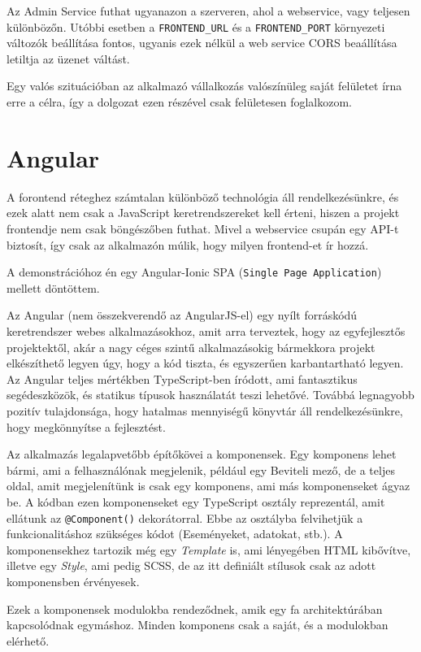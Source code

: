 \documentclass[a4paper,12pt]{thesis-ekf}
\theoremstyle{definition}
\begin{document}
		Az Admin Service futhat ugyanazon a szerveren, ahol a webservice, vagy teljesen különbözőn. Utóbbi esetben a \verb|FRONTEND_URL| és a \verb|FRONTEND_PORT| környezeti változók beállítása fontos, ugyanis ezek nélkül a web service CORS beaállítása letiltja az üzenet váltást.
		
		Egy valós szituációban az alkalmazó vállalkozás valószínüleg saját felületet írna erre a célra, így a dolgozat ezen részével csak felületesen foglalkozom.
		
		\section{Angular}
    		A forontend réteghez számtalan különböző technológia áll rendelkezésünkre, és ezek alatt nem csak a JavaScript keretrendszereket kell érteni, hiszen a projekt frontendje nem csak böngészőben futhat. Mivel a webservice csupán egy API-t biztosít, így csak az alkalmazón múlik, hogy milyen frontend-et ír hozzá.
    		
    		A demonstrációhoz én egy Angular-Ionic SPA (\verb|Single Page Application|) mellett döntöttem.
    		
    		Az Angular (nem összekverendő az AngularJS-el) egy nyílt forráskódú keretrendszer webes alkalmazásokhoz, amit arra terveztek, hogy az egyfejlesztős projektektől, akár a nagy céges szintű alkalmazásokig bármekkora projekt elkészíthető legyen úgy, hogy a kód tiszta, és egyszerűen karbantartható legyen. Az Angular teljes mértékben TypeScript-ben íródott, ami fantasztikus segédeszközök, és statikus típusok használatát teszi lehetővé. Továbbá legnagyobb pozitív tulajdonsága, hogy hatalmas mennyiségű könyvtár áll rendelkezésünkre, hogy megkönnyítse a fejlesztést.\cite{angular-intro}
    		
    		Az alkalmazás legalapvetőbb építőkövei a komponensek. Egy komponens lehet bármi, ami a felhasználónak megjelenik, például egy Beviteli mező, de a teljes oldal, amit megjelenítünk is csak egy komponens, ami más komponenseket ágyaz be. A kódban ezen komponenseket egy TypeScript osztály reprezentál, amit ellátunk az \verb|@Component()| dekorátorral. Ebbe az osztályba felvihetjük a funkcionalitáshoz szükséges kódot (Eseményeket, adatokat, stb.). A komponensekhez tartozik még egy \emph{Template} is, ami lényegében HTML kibővítve, illetve egy \emph{Style}, ami pedig SCSS, de az itt definiált stílusok csak az adott komponensben érvényesek.\cite{angular-components}
    		
    		Ezek a komponensek modulokba rendeződnek, amik egy fa architektúrában kapcsolódnak egymáshoz. Minden komponens csak a saját, és a  modulokban elérhető.
    		
\end{document}
